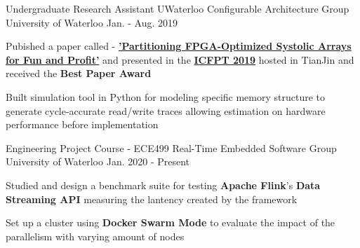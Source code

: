 


\begin{cventries}


\cventry
{Undergraduate Research Assistant} %
{UWaterloo Configurable Architecture Group} %
{University of Waterloo} %
{Jan. - Aug. 2019} %
{ %
\begin{cvitems}
\item {
    Pubished a paper called - 
    \textbf{
        \href{https://git.uwaterloo.ca/watcag-public/fpga-syspart}
        {'Partitioning FPGA-Optimized Systolic Arrays for Fun and Profit'}}
    and presented in the 
    \textbf{
        \href{http://fpt19.tju.edu.cn/Registration.htm}
        {ICFPT 2019}}
    hosted in TianJin and received the \textbf{Best Paper Award}
}
\item {
    Built simulation tool in Python for modeling specific memory 
    structure to generate cycle-accurate
    read/write traces allowing estimation on 
    hardware performance before implementation
}
\end{cvitems}
}


\cventry
{Engineering Project Course - ECE499} %
{Real-Time Embedded Software Group} %
{University of Waterloo} %
{Jan. 2020 - Present} %
{ %
\begin{cvitems}
\item {
    Studied and design a benchmark suite for testing 
    \textbf{Apache Flink}'s \textbf{Data Streaming API}
    measuring the lantency created by the framework
}
\item {
    Set up a cluster using \textbf{Docker Swarm Mode} to evaluate
    the impact of the parallelism with varying amount of nodes
}
\end{cvitems}
}

\end{cventries}